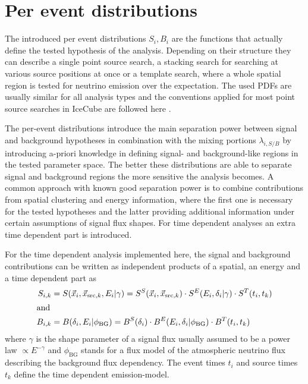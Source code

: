 \section{Per event distributions}
The introduced per event distributions $S_i, B_i$ are the functions that actually define the tested hypothesis of the analysis.
Depending on their structure they can describe a single point source search, a stacking search for searching at various source positions at once or a template search, where a whole spatial region is tested for neutrino emission over the expectation.
The used PDFs are usually similar for all analysis types and the conventions applied for most point source searches in IceCube are followed here .

The per-event distributions introduce the main separation power between signal and background hypotheses in combination with the mixing portions $\lambda_{i,S/B}$ by introducing a-priori knowledge in defining signal- and background-like regions in the tested parameter space.
The better these distributions are able to separate signal and background regions the more sensitive the analysis becomes.
A common approach with known good separation power is to combine contributions from spatial clustering and energy information, where the first one is necessary for the tested hypotheses and the latter providing additional information under certain assumptions of signal flux shapes.
For time dependent analyses an extra time dependent part is introduced.

For the time dependent analysis implemented here, the signal and background contributions can be written as independent products of a spatial, an energy and a time dependent part as
\begin{align}
  S_{i,k}
    &= S(\vec{x}_i, \vec{x}_{\mathrm{src},k}, E_i | \gamma)
     = S^S(\vec{x}_i, \vec{x}_{\mathrm{src},k}) \cdot
       S^E(E_i, \delta_i | \gamma) \cdot
       S^T(t_i, t_k) \\
  \intertext{and}
  B_{i,k}
    &= B(\delta_i, E_i | \phi_\mathrm{BG})
     = B^S(\delta_i) \cdot
       B^E(E_i, \delta_i | \phi_\mathrm{BG}) \cdot
       B^T(t_i, t_k)
\end{align}
where $\gamma$ is the shape parameter of a signal flux usually assumed to be a power law $\propto E^{-\gamma}$ and $\phi_\mathrm{BG}$ stands for a flux model of the atmospheric neutrino flux describing the background flux dependency.
The event times $t_i$ and source times $t_k$ define the time dependent emission-model.

